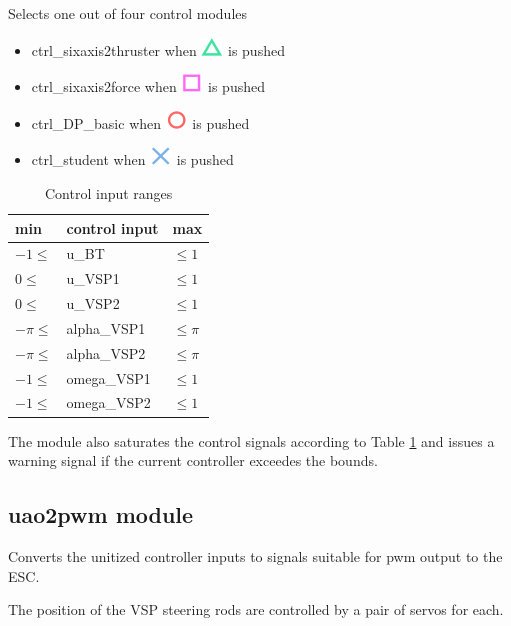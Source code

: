 \documentclass[a4paper,twoside,english]{report}
\providecommand{\tabularnewline}{\\}
\begin{document}
Selects one out of four control modules
\begin{itemize}
\item ctrl\_sixaxis2thruster when \includegraphics[scale=0.4]{fig/sixaxis_triangle}
is pushed
\item ctrl\_sixaxis2force when \includegraphics[scale=0.4]{fig/sixaxis_square}
is pushed
\item ctrl\_DP\_basic when \includegraphics[scale=0.4]{fig/sixaxis_circle}
is pushed
\item ctrl\_student when \includegraphics[scale=0.4]{fig/sixaxis_cross} is
pushed
\end{itemize}
\begin{table}
\centering{}%
\begin{tabular}{lll}
\toprule 
min & control input & max\tabularnewline
\midrule
$-1\leq$ & u\_BT & $\leq1$\tabularnewline
$0\leq$ & u\_VSP1 & $\leq1$\tabularnewline
$0\leq$ & u\_VSP2 & $\leq1$\tabularnewline
$-\pi\leq$ & alpha\_VSP1 & $\leq\pi$\tabularnewline
$-\pi\leq$ & alpha\_VSP2 & $\leq\pi$\tabularnewline
$-1\leq$ & omega\_VSP1 & $\leq1$\tabularnewline
$-1\leq$ & omega\_VSP2 & $\leq1$\tabularnewline
\end{tabular}\caption{\label{tab: CSE1 control input ranges}Control input ranges}
 
\end{table}

The module also saturates the control signals according to Table \ref{tab: CSE1 control input ranges}
and issues a warning signal if the current controller exceedes the
bounds.

\subsection{uao2pwm module}

Converts the unitized controller inputs to signals suitable for pwm
output to the ESC.

The position of the VSP steering rods are controlled by a pair of
servos for each.
\end{document}
